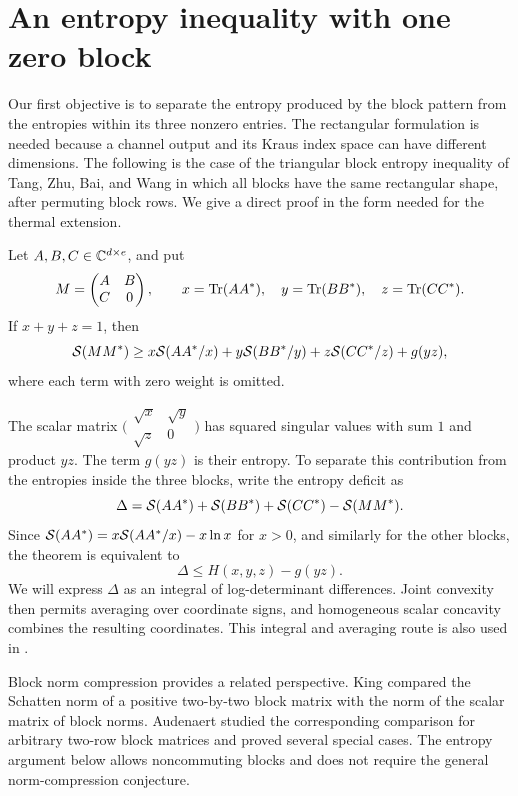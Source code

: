 \section{An entropy inequality with one zero block}
\label{sec:block}

Our first objective is to separate the entropy produced by the block
pattern from the entropies within its three nonzero entries. The
rectangular formulation is needed because a channel output and its
Kraus index space can have different dimensions. The following is the
case of the triangular block entropy inequality of Tang, Zhu, Bai,
and Wang \cite[Theorem~4.2]{TangEtAl2026} in which all blocks have the
same rectangular shape, after permuting block rows. We give a direct
proof in the form needed for the thermal extension.

\begin{theorem}\label{thm:block}
Let $A,B,C\in\mathbb C^{d\times e}$, and put
\[
 M=\begin{pmatrix}A&B\\ C&0\end{pmatrix},\qquad
 x=\operatorname{Tr}(AA^*),\quad y=\operatorname{Tr}(BB^*),\quad z=\operatorname{Tr}(CC^*).
\]
If $x+y+z=1$, then
\begin{equation}\label{eq:block}
 \mathcal S(MM^*)\ge
 x\mathcal S(AA^*/x)+y\mathcal S(BB^*/y)+z\mathcal S(CC^*/z)+g(yz),
\end{equation}
where each term with zero weight is omitted.
\end{theorem}

The scalar matrix
$\bigl(\begin{smallmatrix}\sqrt x&\sqrt y\\\sqrt z&0\end{smallmatrix}\bigr)$
has squared singular values with sum $1$ and product $yz$.
The term $g(yz)$ is their entropy. To separate this contribution from
the entropies inside the three blocks, write the entropy deficit as
\[
 \Delta=\mathcal S(AA^*)+\mathcal S(BB^*)+\mathcal S(CC^*)-\mathcal S(MM^*).
\]
Since $\mathcal S(AA^*)=x\mathcal S(AA^*/x)-x\ln x$ for $x>0$, and similarly
for the other blocks, the theorem is equivalent to
\[
 \Delta\le H(x,y,z)-g(yz).
\]
We will express $\Delta$ as an integral of log-determinant differences.
Joint convexity then permits averaging over coordinate signs, and
homogeneous scalar concavity combines the resulting coordinates.
This integral and averaging route is also used in
\cite[Appendix~A.2--A.4]{TangEtAl2026}.

Block norm compression provides a related perspective. King
\cite[Theorem~1]{King2003} compared the Schatten norm of a positive
two-by-two block matrix with the norm of the scalar matrix of block
norms. Audenaert \cite[Conjecture~1]{Audenaert2008} studied the
corresponding comparison for arbitrary two-row block matrices and
proved several special cases. The entropy argument below allows
noncommuting blocks and does not require the general norm-compression
conjecture.

